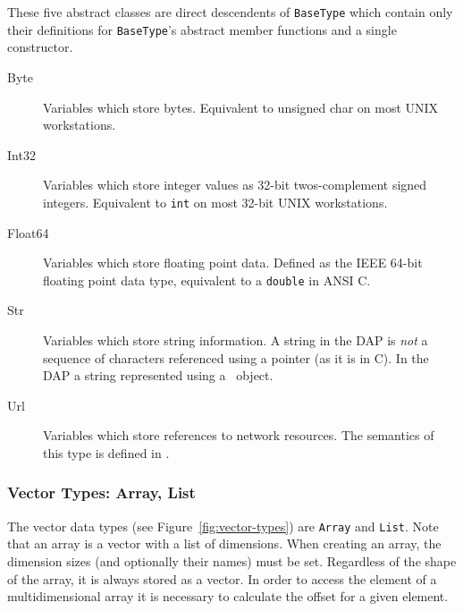 These five abstract classes are direct descendents of {\tt BaseType} which
contain only their definitions for {\tt BaseType}'s abstract member functions
and a single constructor.

\begin{description}

\item [Byte] Variables which store bytes. Equivalent to unsigned
char on most UNIX workstations.

\item [Int32] Variables which store integer values as 32-bit
twos-complement  signed integers. Equivalent to {\tt int} on
most 32-bit UNIX workstations.

\item [Float64] Variables which store floating point data.
Defined as the  IEEE 64-bit floating point data type, equivalent
to a {\tt double} in ANSI  C.

\item [Str] Variables which store string information. A string in the DAP is
{\em not\/} a sequence of characters referenced using a pointer (as it is in
C). In the DAP a string represented using a \Cpp\ object. 

\item [Url] Variables which store references to network
resources. The  semantics of this type is defined in \URL.

\end{description}

\subsubsection{Vector Types: Array, List}

The vector data types (see Figure~\ref{fig:vector-types}) are {\tt Array} and
{\tt List}.  Note that an array is a vector with a list of dimensions. When
creating an array, the dimension sizes (and optionally their names) must be
set.  Regardless of the shape of the array, it is always stored as a vector.
In order to access the element of a multidimensional array it is necessary to
calculate the offset for a given element.

